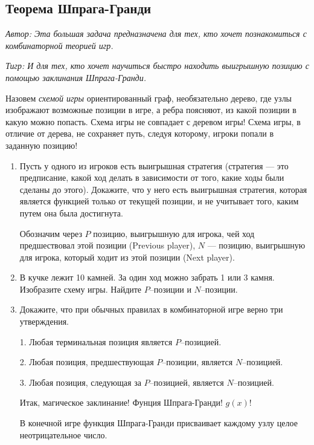 \subsection{Теорема Шпрага-Гранди}

\begin{problem}

{\it Автор: Эта большая задача предназначена для тех, кто хочет познакомиться с комбинаторной теорией игр. }\par
{\it Тигр: И для тех, кто хочет научиться быстро находить выигрышную позицию с помощью заклинания Шпрага-Гранди.}\par
Назовем {\it схемой игры} ориентированный граф, необязательно дерево, где узлы изображают возможные позиции в игре, а ребра поясняют, из какой позиции в какую можно попасть. Схема игры не совпадает с деревом игры! Схема игры, в отличие от дерева, не сохраняет путь, следуя которому, игроки попали в заданную позицию!
\begin{enumerate}
\item 	Пусть у одного из игроков есть выигрышная стратегия (стратегия — это предписание, какой ход делать в зависимости от того, какие ходы были сделаны до этого). Докажите, что у него есть выигрышная стратегия, которая является функцией только от текущей позиции, и не учитывает того, каким путем она была достигнута. \par
Обозначим через $P$ позицию, выигрышную для игрока, чей ход предшествовал этой позиции (Previous player), $N$ — позицию, выигрышную для игрока, который ходит из этой позиции (Next player).\par
\item\label{p:ShG2}	В кучке лежит 10 камней. За один ход можно забрать 1 или 3 камня. Изобразите схему игры. Найдите  $P$--позиции и  $N$--позиции.\par
\item \label{p:ShG3}	Докажите, что при обычных правилах в комбинаторной игре верно три утверждения. \par
1. Любая терминальная позиция является  $P$--позицией. \par
2. Любая позиция, предшествующая  $P$--позиции, является  $N$--позицией. \par
3. Любая позиция, следующая за  $P$--позицией, является  $N$--позицией.\par
Итак, магическое заклинание! Фунция Шпрага-Гранди!  $g\left(x\right)$!\par
В конечной игре функция Шпрага-Гранди присваивает каждому узлу целое неотрицательное число.

\end{enumerate}
\end{problem}
